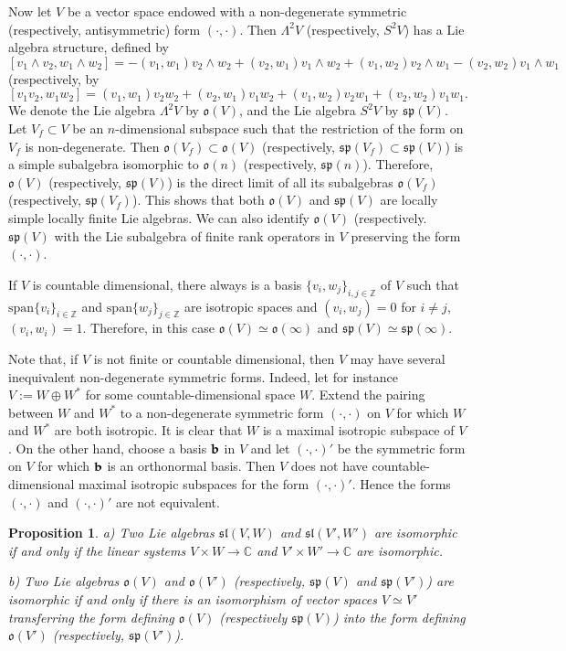 \documentclass[10pt]{amsart}
\newcounter{theorem}
\newtheorem{prop}[theo]{Proposition}
\newcommand {\ZZ} {\mathbb {Z}}
\newcommand {\CC} {\mathbb {C}}
\renewcommand{\sp}{\mathfrak{sp}}
\renewcommand{\sl}{\mathfrak{sl}}
\newcommand{\oo}{\mathfrak{o}}
\renewcommand{\span}{\mathrm{span}}
\begin{document}
Now  let $V$ be a vector space endowed with a non-degenerate symmetric (respectively, antisymmetric) form $(\cdot,\cdot)$. 
Then $\Lambda^2V$ (respectively, $S^2V$) has a Lie algebra structure, defined by 
$$[v_1\wedge v_2,w_1\wedge w_2]=-(v_1,w_1)v_2\wedge w_2+(v_2,w_1)v_1\wedge w_2 +(v_1,w_2)v_2\wedge w_1-(v_2,w_2)v_1\wedge w_1$$ 
(respectively, by $$[v_1 v_2,w_1 w_2]=(v_1,w_1)v_2 w_2+(v_2,w_1)v_1 w_2 +(v_1,w_2)v_2 w_1+(v_2,w_2)v_1 w_1.$$ 
We denote the Lie algebra  $\Lambda^2V$ by $\oo(V)$, and the Lie algebra $S^2V$ by $\sp(V)$. Let $V_f\subset V$ be an $n$-dimensional subspace such that the 
restriction of the form on $V_f$ is non-degenerate. Then $\oo(V_f)\subset \oo(V)$ (respectively, $\sp(V_f)\subset \sp(V)$) is a simple subalgebra 
isomorphic to $\oo(n)$ (respectively, $\sp(n)$). Therefore, $\oo(V)$ (respectively, $\sp(V)$) is the direct limit of all its subalgebras $\oo(V_f)$ 
(respectively, $\sp(V_f)$). This shows that both $\oo(V)$ and $\sp(V)$ are locally simple locally 
finite Lie algebras. We can also identify $\oo(V)$ (respectively. $\sp(V)$ with the Lie subalgebra of finite rank operators in $V$ preserving the form  
$(\cdot,\cdot)$.

If $V$ is countable dimensional, there always is a basis $\lbrace v_i,w_j\rbrace_{i,j \in \ZZ}$ of $V$ such that $\span\lbrace v_i\rbrace_{i \in \ZZ}$ and $\span\lbrace w_j\rbrace_{j \in \ZZ}$ are isotropic spaces and $(v_i, w_j) = 0$ for $i \neq j$, $(v_i, w_i)=1$. Therefore, in this case $\oo(V) \simeq \oo(\infty)$ and  $\sp(V)\simeq \sp(\infty)$.

Note that, if $V$ is not finite or countable dimensional, then $V$ may have several inequivalent 
non-degenerate symmetric forms. Indeed, let for instance $V:=W\oplus W^*$ for some countable-dimensional space $W$. Extend the pairing between $W$ and $W^*$ to a 
non-degenerate symmetric form $(\cdot,\cdot)$ on $V$ for which $W$ and $W^*$ are both isotropic. It is clear that $W$ is a maximal isotropic subspace of $V$. 
On the other hand, choose a basis $\bf b$ in $V$ and let $(\cdot,\cdot)'$ be the symmetric form on $V$ for which $\bf b$ is an orthonormal basis. Then 
$V$ does not have countable-dimensional maximal isotropic subspaces for the form $(\cdot,\cdot)'$. Hence the forms $(\cdot,\cdot)$ and $(\cdot,\cdot)'$  are 
not equivalent.



\begin{prop}\label{prop:1.29.9}
a) Two Lie algebras $\sl(V,W)$ and $\sl(V',W')$ are isomorphic if and only if the linear systems $V\times W\rightarrow \CC$ and 
$V' \times W' \rightarrow \CC$ are isomorphic.

b) Two Lie algebras $\oo(V)$ and $\oo(V')$ (respectively, $\sp(V)$ and $\sp(V')$) are isomorphic if and only if there is an isomorphism of vector spaces 
$V\simeq V'$ transferring the form defining $\oo(V)$ (respectively $\sp(V)$) into the form defining $\oo(V')$ (respectively, $\sp(V')$).

\end{prop}
\end{document}
